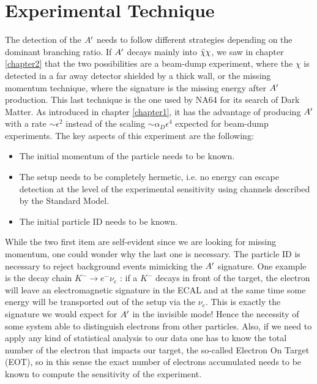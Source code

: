 \section{Experimental Technique}
\label{ch2:sec:experimental-technique}

The detection of the $A'$ needs to follow different strategies depending on the dominant branching ratio. If $A'$ decays mainly into $\bar{\chi} \chi$, we saw in chapter \ref{chapter2} that the two possibilities are a beam-dump experiment, where the $\chi$ is detected in a far away detector shielded by a thick wall, or the missing momentum technique, where the signature is the missing energy after $A'$ production. This last technique is the one used by NA64 for its search of Dark Matter. As introduced in chapter \ref{chapter1}, it has the advantage of producing $A'$ with a rate $\sim \epsilon^2$ instead of the scaling $\sim \alpha_D \epsilon^4$ expected for beam-dump experiments. The key aspects of this experiment are the following:

\begin{itemize}
\item The initial momentum of the particle needs to be known.
\item The setup needs to be completely hermetic, i.e. no energy can escape detection at the level of the experimental sensitivity using channels described by the Standard Model.
\item The initial particle ID needs to be known.
\end{itemize}

While the two first item are self-evident since we are looking for missing momentum, one could wonder why the last one is necessary. The particle ID is necessary to reject background events mimicking the $A'$ signature. One example is the decay chain $K^- \to e^- \nu_e$ \cite{review-particle-physics}: if a $K^-$ decays in front of the target, the electron will leave an electromagnetic signature in the ECAL and at the same time some energy will be transported out of the setup via the $\nu_e$. This is exactly the signature we would expect for $A'$ in the invisible mode! Hence the necessity of some system able to distinguish electrons from other particles. Also, if we need to apply any kind of statistical analysis to our data one has to know the total number of the electron that impacts our target, the so-called Electron On Target (EOT), so in this sense the exact number of electrons accumulated needs to be known to compute the sensitivity of the experiment. 

